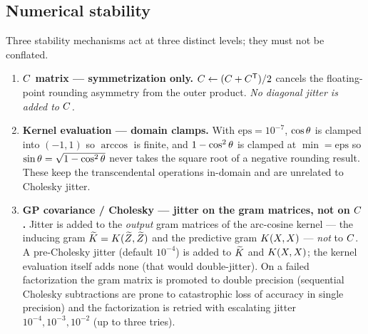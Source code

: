 \subsection{Numerical stability}
\label{subsec:numstab}

Three stability mechanisms act at three distinct levels; they must not be conflated.

\begin{enumerate}[leftmargin=1.6em]
\item \textbf{$C$ matrix --- symmetrization only.}
  $C\leftarrow(C+C^{\mathsf{T}})/2$ cancels the floating-point rounding
  asymmetry from the outer product. \emph{No diagonal jitter is added to $C$.}
\item \textbf{Kernel evaluation --- domain clamps.} With
  $\text{eps}=10^{-7}$, $\cos\theta$ is clamped into $(-1,1)$ so $\arccos$ is finite,
  and $1-\cos^2\theta$ is clamped at $\min=\text{eps}$ so $\sin\theta=\sqrt{1-\cos^2\theta}$
  never takes the square root of a negative rounding result. These keep the
  transcendental operations in-domain and are unrelated to Cholesky jitter.
\item \textbf{GP covariance / Cholesky --- jitter on the gram matrices, not on
  $C$.} Jitter is added to the \emph{output} gram matrices of the arc-cosine
  kernel --- the inducing gram $\widetilde{K}=K(\widetilde{Z},\widetilde{Z})$ and the predictive gram
  $K(X,X)$ --- \emph{not} to $C$. A pre-Cholesky jitter (default $10^{-4}$) is
  added to $\widetilde{K}$ and $K(X,X)$; the kernel evaluation itself adds none (that
  would double-jitter). On a failed factorization the gram matrix is promoted to
  double precision (sequential Cholesky subtractions are prone to catastrophic loss
  of accuracy in single precision) and the factorization is retried with escalating
  jitter $10^{-4},10^{-3},10^{-2}$ (up to three tries).
\end{enumerate}

